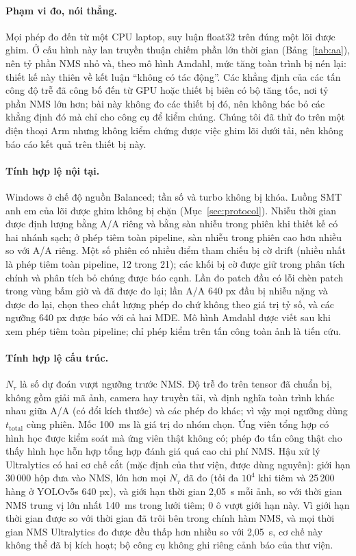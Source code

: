 \documentclass[a4paper,fleqn]{cas-dc}
\newcommand{\Ntau}{N_{\tau}}
\begin{document}
\paragraph{Phạm vi đo, nói thẳng.}
Mọi phép đo đến từ một CPU laptop, suy luận float32 trên đúng một lõi được ghim. Ở cấu hình này lan truyền thuận chiếm phần lớn thời gian (Bảng~\ref{tab:aa}), nên tỷ phần NMS nhỏ và, theo mô hình Amdahl, mức tăng toàn trình bị nén lại: thiết kế này thiên về kết luận ``không có tác động''. Các khẳng định của các tấn công độ trễ đã công bố đến từ GPU hoặc thiết bị biên có bộ tăng tốc, nơi tỷ phần NMS lớn hơn; bài này không đo các thiết bị đó, nên không bác bỏ các khẳng định đó mà chỉ cho công cụ để kiểm chúng. Chúng tôi đã thử đo trên một điện thoại Arm nhưng không kiểm chứng được việc ghim lõi dưới tải, nên không báo cáo kết quả trên thiết bị này.
\paragraph{Tính hợp lệ nội tại.}
Windows ở chế độ nguồn Balanced; tần số và turbo không bị khóa. Luồng SMT anh em của lõi được ghim không bị chặn (Mục~\ref{sec:protocol}). Nhiễu thời gian được định lượng bằng A/A riêng và bằng sàn nhiễu trong phiên khi thiết kế có hai nhánh sạch; ở phép tiêm toàn pipeline, sàn nhiễu trong phiên cao hơn nhiều so với A/A riêng. Một số phiên có nhiều điểm tham chiếu bị cờ drift (nhiều nhất là phép tiêm toàn pipeline, 12 trong 21); các khối bị cờ được giữ trong phân tích chính và phân tích bỏ chúng được báo cạnh. Lần đo patch đầu có lỗi chèn patch trong vùng bấm giờ và đã được đo lại; lần A/A 640 px đầu bị nhiễu nặng và được đo lại, chọn theo chất lượng phép đo chứ không theo giá trị tỷ số, và các ngưỡng 640 px được báo với cả hai MDE. Mô hình Amdahl được viết sau khi xem phép tiêm toàn pipeline; chỉ phép kiểm trên tấn công toàn ảnh là tiến cứu.
\paragraph{Tính hợp lệ cấu trúc.}
$\Ntau$ là số dự đoán vượt ngưỡng trước NMS. Độ trễ đo trên tensor đã chuẩn bị, không gồm giải mã ảnh, camera hay truyền tải, và định nghĩa toàn trình khác nhau giữa A/A (có đổi kích thước) và các phép đo khác; vì vậy mọi ngưỡng dùng $t_{\mathrm{total}}$ cùng phiên. Mốc 100~ms là giá trị do nhóm chọn. Ứng viên tổng hợp có hình học được kiểm soát mà ứng viên thật không có; phép đo tấn công thật cho thấy hình học hỗn hợp tổng hợp đánh giá quá cao chi phí NMS. Hậu xử lý Ultralytics có hai cơ chế cắt (mặc định của thư viện, được dùng nguyên): giới hạn 30\,000 hộp đưa vào NMS, lớn hơn mọi $\Ntau$ đã đo (tối đa $10^4$ khi tiêm và 25\,200 hàng ở YOLOv5s 640 px), và giới hạn thời gian 2,05~s mỗi ảnh, so với thời gian NMS trung vị lớn nhất 140~ms trong lưới tiêm; 0 ô vượt giới hạn này. Vì giới hạn thời gian được so với thời gian đã trôi bên trong chính hàm NMS, và mọi thời gian NMS Ultralytics đo được đều thấp hơn nhiều so với 2,05~s, cơ chế này không thể đã bị kích hoạt; bộ công cụ không ghi riêng cảnh báo của thư viện.
\end{document}
